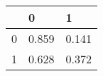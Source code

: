 \begin{tabular}{lll}
\toprule
 & 0 & 1 \\
\midrule
0 & 0.859 & 0.141 \\
1 & 0.628 & 0.372 \\
\bottomrule
\end{tabular}
